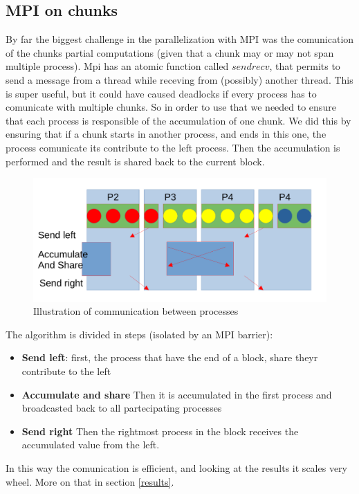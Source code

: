 \documentclass[10pt]{article}
\begin{document}
\begin{multicols}{2}
\subsection*{MPI on chunks}
By far the biggest challenge in the parallelization with MPI was the comunication of the chunks partial computations (given that a chunk may or may not span multiple process).
Mpi has an atomic function called $sendrecv$, that permits to send a message from a thread while receving from (possibly) another thread.
This is super useful, but it could have caused deadlocks if every process has to comunicate with multiple chunks.
So in order to use that we needed to ensure that each process is responsible of the accumulation of one chunk.
We did this by ensuring that if a chunk starts in another process, and ends in this one, the process comunicate its contribute to the left process. Then the accumulation is performed and the result is shared back to the current block.

\begin{figure}[H]
  \includegraphics[scale=0.25]{img/MPI.png}
  \centering
  \caption{Illustration of communication between processes}
  \label{fig:MPI}
\end{figure}

The algorithm is divided in steps (isolated by an MPI barrier):
\begin{itemize}
  \item \textbf{Send left}: first, the process that have the end of a block, share theyr contribute to the left
  \item \textbf{Accumulate and share} Then it is accumulated in the first process and broadcasted back to all partecipating processes
  \item \textbf{Send right} Then the rightmost process in the block receives the accumulated value from the left.
\end{itemize}

In this way the comunication is efficient, and looking at the results it scales very wheel. More on that in section \ref{results}.



\end{multicols}
\end{document}
